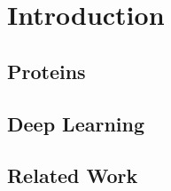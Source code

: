 \chapter{Introduction}

\section{Proteins}

\section{Deep Learning}

\section{Related Work}










